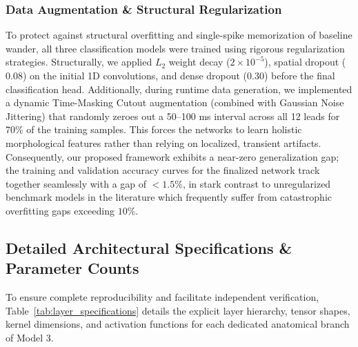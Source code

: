 \documentclass[12pt]{elsarticle}
\begin{document}
\subsubsection{Data Augmentation \& Structural Regularization}
To protect against structural overfitting and single-spike memorization of baseline wander, all three classification models were trained using rigorous regularization strategies. Structurally, we applied $L_2$ weight decay ($2 \times 10^{-5}$), spatial dropout ($0.08$) on the initial 1D convolutions, and dense dropout ($0.30$) before the final classification head. Additionally, during runtime data generation, we implemented a dynamic Time-Masking Cutout augmentation (combined with Gaussian Noise Jittering) that randomly zeroes out a 50--100 ms interval across all 12 leads for 70\% of the training samples. This forces the networks to learn holistic morphological features rather than relying on localized, transient artifacts. Consequently, our proposed framework exhibits a near-zero generalization gap; the training and validation accuracy curves for the finalized network track together seamlessly with a gap of $<1.5\%$, in stark contrast to unregularized benchmark models in the literature which frequently suffer from catastrophic overfitting gaps exceeding $10\%$.

\subsection{Detailed Architectural Specifications \& Parameter Counts}
\label{sec:arch_specs}
To ensure complete reproducibility and facilitate independent verification, Table~\ref{tab:layer_specifications} details the explicit layer hierarchy, tensor shapes, kernel dimensions, and activation functions for each dedicated anatomical branch of Model 3.
\end{document}
